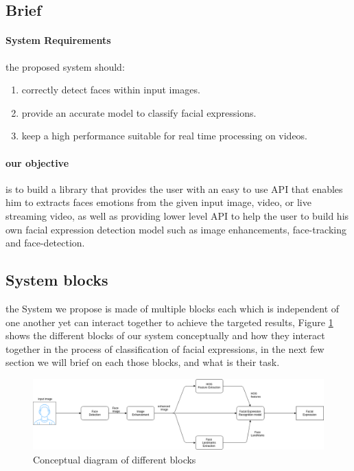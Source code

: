 \subsection{Brief}
\paragraph{System Requirements}
the proposed system should:
\begin{enumerate}
	\item correctly detect faces within input images.
	\item provide an accurate model to classify facial expressions.
	\item keep a high performance suitable for real time processing on videos.
\end{enumerate}
\paragraph{our objective} is to build a library that provides the user with an easy to use API that enables him to extracts faces emotions from the given input image, video, or live streaming video, as well as providing lower level API to help the user to build his own facial expression detection model such as image enhancements, face-tracking and face-detection.
\subsection{System blocks}
the System we propose is made of multiple blocks each which is independent of one another yet can interact together to achieve the targeted results, Figure 
\ref{fig:facial_expression_detection} shows the different blocks of our system conceptually and how they interact together in the process of classification of facial expressions, in the next few section we will brief on each those blocks, and what is their task. 

\begin{figure}
	\centering
	\includegraphics[width=\textwidth]{images/facial_expression_detection.png}
	\caption{Conceptual diagram of different blocks}
	\label{fig:facial_expression_detection}
\end{figure}

